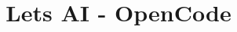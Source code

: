 \documentclass[xcolor=dvipsnames,compress,t,pdf,9pt]{beamer}
\title[\insertframenumber /\inserttotalframenumber]{Lets AI - OpenCode}
\begin{document}
	\begin{frame}
	\titlepage
	\end{frame}
	

%	
	
%	
\end{document}
